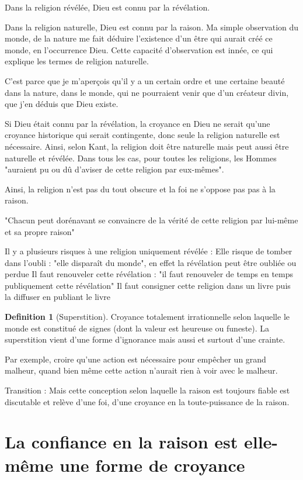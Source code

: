 \documentclass[french]{book}
\theoremstyle{definition}
\newtheorem*{dfn}{Definition}
\begin{document}
Dans la religion révélée, Dieu est connu par la révélation.

Dans la religion naturelle, Dieu est connu par la raison. Ma simple observation du monde, de la nature me fait déduire l'existence d'un être qui aurait créé ce monde, en l'occurrence Dieu. Cette capacité d'observation est innée, ce qui explique les termes de religion naturelle.

C'est parce que je m'aperçois qu'il y a un certain ordre et une certaine beauté dans la nature, dans le monde, qui ne pourraient venir que d'un créateur divin, que j'en déduis que Dieu existe.

Si Dieu était connu par la révélation, la croyance en Dieu ne serait qu'une croyance historique qui serait contingente, donc seule la religion naturelle est nécessaire. Ainsi, selon Kant, la religion doit être naturelle mais peut aussi être naturelle et révélée.
Dans tous les cas, pour toutes les religions, les Hommes "auraient pu ou dû d'aviser de cette religion par eux-mêmes".

Ainsi, la religion n'est pas du tout obscure et la foi ne s'oppose pas pas à la raison.

"Chacun peut dorénavant se convaincre de la vérité de cette religion par lui-même et sa propre raison"

Il y a plusieurs risques à une religion uniquement révélée :
Elle risque de tomber dans l'oubli : "elle disparaît du monde", en effet la révélation peut être oubliée ou perdue
Il faut renouveler cette révélation : "il faut renouveler de temps en temps publiquement cette révélation"
Il faut consigner cette religion dans un livre puis la diffuser en publiant le livre

\begin{dfn}[Superstition]
Croyance totalement irrationnelle selon laquelle le monde est constitué de signes (dont la valeur est heureuse ou funeste). La superstition vient d'une forme d'ignorance mais aussi et surtout d'une crainte.
\end{dfn}


Par exemple, croire qu'une action est nécessaire pour empêcher un grand malheur, quand bien même cette action n'aurait rien à voir avec le malheur.


Transition : Mais cette conception selon laquelle la raison est toujours fiable est discutable et relève d'une foi, d'une croyance en la toute-puissance de la raison.

\section{La confiance en la raison est elle-même une forme de croyance}
\end{document}
